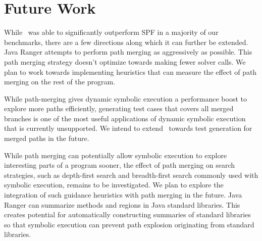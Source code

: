 \section{Future Work}
\label{sec:futureWork}
While \tool\ was able to significantly outperform SPF in a majority of our benchmarks, there are a few directions
along which it can further be extended.
%
Java Ranger attempts to perform path merging as aggressively as possible.
%
This path merging strategy doesn't optimize towards making fewer solver calls.
%
We plan to work towards implementing heuristics that can measure the effect of path merging on the rest of the program.

While path-merging gives dynamic symbolic execution a performance boost to explore more paths
efficiently, generating test cases that covers all merged branches is one of the most useful applications of dynamic
symbolic execution that is currently unsupported.
%
We intend to extend \tool\ towards test generation for merged paths in the future.

While path merging can potentially allow symbolic execution to explore interesting parts of a program sooner, the
effect of path merging on search strategies, such as depth-first search and breadth-first search commonly used with
symbolic execution, remains to be investigated.
%
We plan to explore the integration of such guidance heuristics with path merging in the future.
%
Java Ranger can summarize methods and regions in Java standard libraries.
%
This creates potential for automatically constructing summaries of standard libraries so that symbolic execution
can prevent path explosion originating from standard libraries.
%
